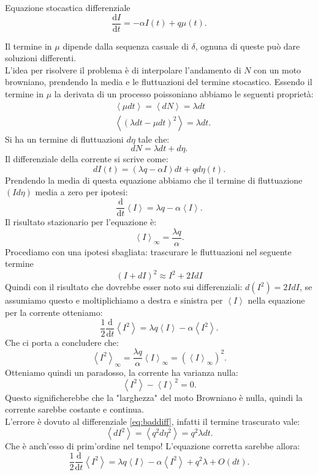 \begin{redbox}{Equazione stocastica differenziale}
 \[
    \frac{\text{d} I}{\text{d} t} = -\alpha I(t) + q\mu (t) 
.\]    
\end{redbox}
\noindent
Il termine in $\mu$ dipende dalla sequenza casuale di $\delta$, ognuna di queste può dare soluzioni differenti.\\
L'idea per risolvere il problema è di interpolare l'andamento di $N$ con un moto browniano, prendendo la media e le fluttuazioni del termine stocastico.
Essendo il termine in $\mu$ la derivata di un processo poissoniano abbiamo le seguenti proprietà:
\[\begin{aligned}
    &\left<\mu dt\right>=\left<dN\right> = \lambda dt\\
    & \left<\left(\lambda dt - \mu dt\right)^2\right> = \lambda dt
.\end{aligned}\]
Si ha un termine di fluttuazioni $d\eta$ tale che:
\[
    dN = \lambda dt + d\eta	
.\] 
Il differenziale della corrente si scrive come:
\[
    dI(t) = \left(\lambda q-\alpha I\right)dt+ qd\eta (t) 
.\] 
Prendendo la media di questa equazione abbiamo che il termine di fluttuazione $\left(I d\eta\right)$ media a zero per ipotesi:
\[
    \frac{\text{d} }{\text{d} t} \left<I\right> = \lambda q -\alpha\left<I\right>
.\] 
Il risultato stazionario per l'equazione è:
\[
    \left<I\right>_{\infty}=\frac{\lambda q}{\alpha}
.\] 
Procediamo con una ipotesi sbagliata: trascurare le fluttuazioni nel seguente termine
\begin{equation}
    \left(I+dI\right)^2 \approx I^2 + 2IdI	\label{eq:baddiff}
\end{equation}
Quindi con il risultato che dovrebbe esser noto sui differenziali: $d\left(I^2\right) = 2IdI$, se assumiamo questo e moltiplichiamo a destra e sinistra per $\left<I\right>$ nella equazione   per la corrente otteniamo:
\[
    \frac{1}{2}\frac{\text{d} }{\text{d} t} \left<I^2\right>= \lambda q\left<I\right>-\alpha\left<I^2\right>
.\] 
Che ci porta a concludere che:
\[
    \left<I^2\right>_{\infty} = \frac{\lambda q}{\alpha}\left<I\right>_{\infty} = \left(\left<I\right>_{\infty}\right)^2
.\] 
Otteniamo quindi un paradosso, la corrente ha varianza nulla:
\[
  \left<I^2\right>-\left<I\right>^2 = 0  
.\] 
Questo significherebbe che la "larghezza" del moto Browniano è nulla, quindi la corrente sarebbe costante e continua.\\
L'errore è dovuto al differenziale \ref{eq:baddiff}, infatti il termine trascurato vale:
\[
    \left<dI^2\right> = \left<q^2d\eta^2\right> = q^2\lambda dt
.\] 
Che è anch'esso di prim'ordine nel tempo! L'equazione corretta sarebbe allora:
\[
    \frac{1}{2}\frac{\text{d} }{\text{d} t} \left<I^2\right>= \lambda q\left<I\right>-\alpha\left<I^2\right> + q^2\lambda + O(dt)
.\]


